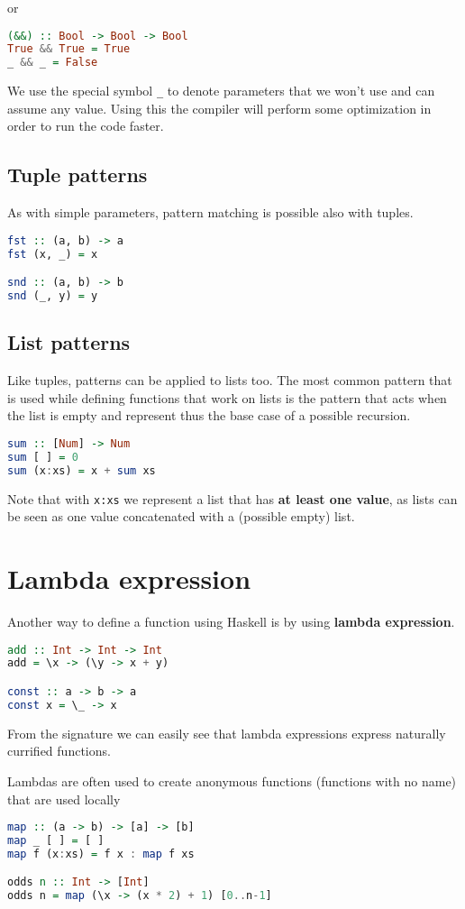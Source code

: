 or 

\begin{lstlisting}[language=haskell]
(&&) :: Bool -> Bool -> Bool
True && True = True
_ && _ = False
\end{lstlisting}

We use the special symbol \texttt{\_} to denote parameters that we won't use and can assume any value. Using this the compiler will perform some optimization in order to run the code faster. 

\subsection{Tuple patterns}
As with simple parameters, pattern matching is possible also with tuples.

\begin{lstlisting}[language=haskell]
fst :: (a, b) -> a
fst (x, _) = x

snd :: (a, b) -> b
snd (_, y) = y
\end{lstlisting}

\subsection{List patterns}
Like tuples, patterns can be applied to lists too. The most common pattern that is used while defining functions that work on lists is the pattern that acts when the list is empty and represent thus the base case of a possible recursion. 

\begin{lstlisting}[language=haskell]
sum :: [Num] -> Num
sum [ ] = 0
sum (x:xs) = x + sum xs
\end{lstlisting}

Note that with \texttt{x:xs} we represent a list that has \textbf{at least one value}, as lists can be seen as one value concatenated with a (possible empty) list.


\section{Lambda expression}
Another way to define a function using Haskell is by using \textbf{lambda expression}.

\begin{lstlisting}[language=haskell]
add :: Int -> Int -> Int 
add = \x -> (\y -> x + y)

const :: a -> b -> a
const x = \_ -> x
\end{lstlisting}

From the signature we can easily see that lambda expressions express naturally currified functions. 
\linebreak \linebreak

Lambdas are often used to create anonymous functions (functions with no name) that are used locally

\begin{lstlisting}[language=haskell]
map :: (a -> b) -> [a] -> [b]
map _ [ ] = [ ]
map f (x:xs) = f x : map f xs

odds n :: Int -> [Int]
odds n = map (\x -> (x * 2) + 1) [0..n-1]
\end{lstlisting}
